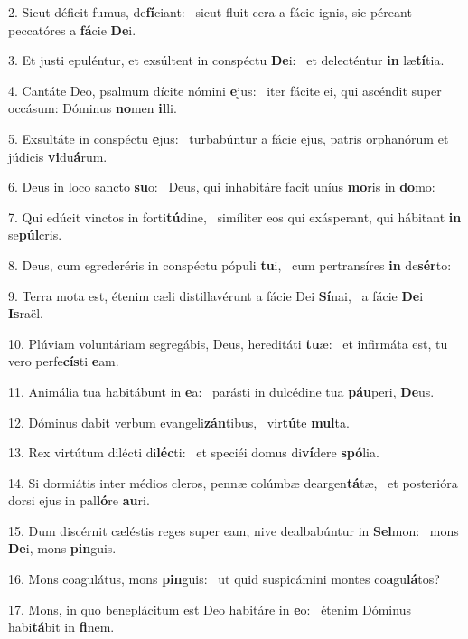 2. Sicut déficit fumus, de\textbf{fí}ciant: \ast\  sicut fluit cera a fácie ignis, sic péreant peccatóres a \textbf{fá}cie \textbf{De}i.\

3. Et justi epuléntur, et exsúltent in conspéctu \textbf{De}i: \ast\  et delecténtur \textbf{in} læ\textbf{tí}tia.\

4. Cantáte Deo, psalmum dícite nómini \textbf{e}jus: \ast\  iter fácite ei, qui ascéndit super occásum: Dóminus \textbf{no}men \textbf{il}li.\

5. Exsultáte in conspéctu \textbf{e}jus: \ast\  turbabúntur a fácie ejus, patris orphanórum et júdicis \textbf{vi}du\textbf{á}rum.\

6. Deus in loco sancto \textbf{su}o: \ast\  Deus, qui inhabitáre facit uníus \textbf{mo}ris in \textbf{do}mo:\

7. Qui edúcit vinctos in forti\textbf{tú}dine, \ast\  simíliter eos qui exásperant, qui hábitant \textbf{in} se\textbf{púl}cris.\

8. Deus, cum egrederéris in conspéctu pópuli \textbf{tu}i, \ast\  cum pertransíres \textbf{in} de\textbf{sér}to:\

9. Terra mota est, étenim cæli distillavérunt a fácie Dei \textbf{Sí}nai, \ast\  a fácie \textbf{De}i \textbf{Is}raël.\

10. Plúviam voluntáriam segregábis, Deus, hereditáti \textbf{tu}æ: \ast\  et infirmáta est, tu vero perfe\textbf{cís}ti \textbf{e}am.\

11. Animália tua habitábunt in \textbf{e}a: \ast\  parásti in dulcédine tua \textbf{páu}peri, \textbf{De}us.\

12. Dóminus dabit verbum evangeli\textbf{zán}tibus, \ast\  vir\textbf{tú}te \textbf{mul}ta.\

13. Rex virtútum dilécti di\textbf{léc}ti: \ast\  et speciéi domus di\textbf{ví}dere \textbf{spó}lia.\

14. Si dormiátis inter médios cleros, pennæ colúmbæ deargen\textbf{tá}tæ, \ast\  et posterióra dorsi ejus in pal\textbf{ló}re \textbf{au}ri.\

15. Dum discérnit cæléstis reges super eam, nive dealbabúntur in \textbf{Sel}mon: \ast\  mons \textbf{De}i, mons \textbf{pin}guis.\

16. Mons coagulátus, mons \textbf{pin}guis: \ast\  ut quid suspicámini montes co\textbf{a}gu\textbf{lá}tos?\

17. Mons, in quo beneplácitum est Deo habitáre in \textbf{e}o: \ast\  étenim Dóminus habi\textbf{tá}bit in \textbf{fi}nem.\

